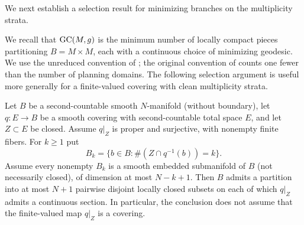 We next establish a selection result for minimizing branches on the multiplicity strata.

We recall that $\text{GC}(M,g)$ is the minimum
number of locally compact pieces partitioning
$B=M\times M$, each with a continuous choice
of minimizing geodesic. We use the unreduced
convention of \cite{MescherStegemeyer2023};
the original convention of
\cite{RecioMitter2021} counts one fewer than
the number of planning domains.
The following selection argument is useful
more generally for a finite-valued covering
with clean multiplicity strata.

\begin{theorem}\label{thm:finite-cover-selection}
Let $B$ be a second-countable smooth $N$-manifold
(without boundary), let $q:E\to B$ be a smooth
covering with second-countable total space $E$, and let
$Z\subset E$ be closed. Assume
$q|_Z$ is proper and surjective, with nonempty
finite fibers. For $k\geq1$ put
\[
 B_k=\{b\in B:\#(Z\cap q^{-1}(b))=k\}.
\]
Assume every nonempty $B_k$ is a smooth
embedded submanifold of $B$ (not necessarily
closed), of dimension at most $N-k+1$.
Then $B$ admits a partition into at most
$N+1$ pairwise disjoint locally closed subsets
on each of which $q|_Z$ admits a continuous
section. In particular, the conclusion does
not assume that the finite-valued map
$q|_Z$ is a covering.
\end{theorem}

